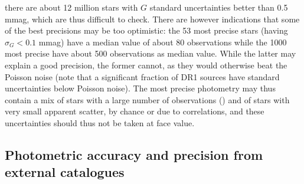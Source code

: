 
 there are about 12 million stars with $G$ standard uncertainties 
better than 0.5 mmag, which are thus difficult to check. 
There are however indications that some of the best precisions may be too optimistic:
the 53 most precise stars (having $\sigma_G< 0.1$ mmag) have a median value
of about 80 observations while the 1000 most precise have about 500 observations 
as median value. While the latter may explain a good precision, the
former cannot, as they would otherwise beat the Poisson noise (note that
a significant fraction of DR1 sources have standard uncertainties below 
Poisson noise). 
The most precise photometry may thus contain a mix of stars with
a large number of observations () 
and of stars with very small apparent scatter, 
by chance or due to correlations, and these uncertainties 
should thus not be taken at face value.

\subsection{Photometric accuracy and precision from external catalogues\label{sect:wp944photometry}}


